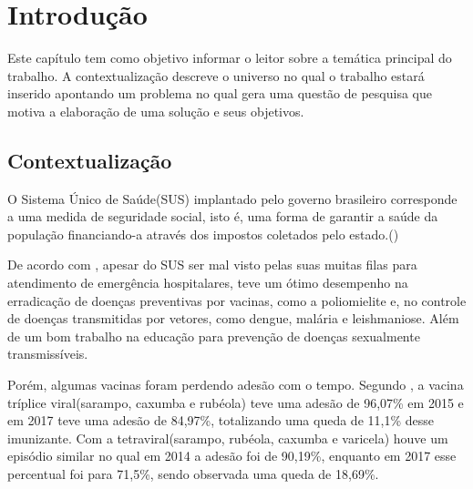 \chapter*[Introdução]{Introdução}



Este capítulo tem como objetivo informar o leitor sobre a temática
principal do trabalho. A contextualização descreve o universo no qual o
trabalho estará inserido apontando um problema no qual gera uma questão
de pesquisa que motiva a elaboração de uma solução e seus objetivos.

\section{Contextualização}



O Sistema Único de Saúde(SUS) implantado pelo governo brasileiro corresponde a uma medida de seguridade social, isto é, uma forma de garantir a saúde da população financiando-a através dos impostos coletados pelo estado.(\cite{paim_o_2009})

De acordo com \cite{noauthor_sis_2017}, apesar do SUS ser mal visto pelas suas muitas filas para atendimento de emergência hospitalares, teve um ótimo desempenho na erradicação de doenças preventivas por vacinas, como a poliomielite e, no controle de doenças transmitidas por vetores, como dengue, malária e leishmaniose. Além de um bom trabalho na educação para prevenção de doenças sexualmente transmissíveis.

Porém, algumas vacinas foram perdendo adesão com o tempo. Segundo \cite{lima_os_2020}, a vacina tríplice viral(sarampo, caxumba e rubéola) teve uma adesão de 96,07\% em 2015 e em 2017 teve uma adesão de 84,97\%, totalizando uma queda de 11,1\% desse imunizante. Com a tetraviral(sarampo, rubéola, caxumba e varicela) houve um episódio similar no qual em 2014 a adesão foi de 90,19\%, enquanto em 2017 esse percentual foi para 71,5\%, sendo observada uma queda de 18,69\%.

